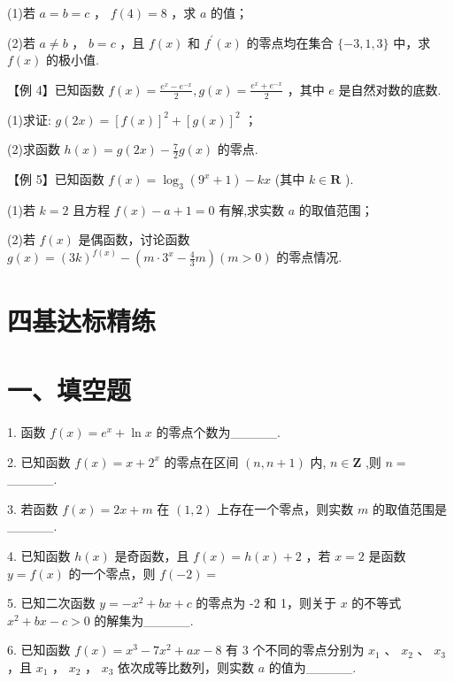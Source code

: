 (1)若 $a = b = c$ ， $f\left( 4\right)  = 8$ ，求 $a$ 的值；

(2)若 $a \neq  b$ ， $b = c$ ，且 $f\left( x\right)$ 和 ${f}^{\prime }\left( x\right)$ 的零点均在集合 $\{  - 3,1,3\}$ 中，求 $f\left( x\right)$ 的极小值.

【例 4】已知函数 $f\left( x\right)  = \frac{{{e}}^{x} - {{e}}^{-x}}{2},g\left( x\right)  = \frac{{{e}}^{x} + {{e}}^{-x}}{2}$ ，其中 ${e}$ 是自然对数的底数.

(1)求证: $g\left( {2x}\right)  = {\left\lbrack  f\left( x\right) \right\rbrack  }^{2} + {\left\lbrack  g\left( x\right) \right\rbrack  }^{2}$ ；

(2)求函数 $h\left( x\right)  = g\left( {2x}\right)  - \frac{7}{2}g\left( x\right)$ 的零点.

【例 5】已知函数 $f\left( x\right)  = {\log }_{3}\left( {{9}^{x} + 1}\right)  - {kx}$ (其中 $k \in  \mathbf{R}$ ).

(1)若 $k = 2$ 且方程 $f\left( x\right)  - a + 1 = 0$ 有解,求实数 $a$ 的取值范围；

(2)若 $f\left( x\right)$ 是偶函数，讨论函数 $g\left( x\right)  = {\left( 3k\right) }^{f\left( x\right) } - \left( {m \cdot  {3}^{x} - \frac{4}{3}m}\right) \left( {m > 0}\right)$ 的零点情况.

\section*{四基达标精练}

\section*{一、填空题}

1. 函数 $f\left( x\right)  = {{e}}^{x} + \ln x$ 的零点个数为\_\_\_\_\_.

2. 已知函数 $f\left( x\right)  = x + {2}^{x}$ 的零点在区间 $\left( {n,n + 1}\right)$ 内, $n \in  \mathbf{Z}$ ,则 $n =$ \_\_\_\_\_.

3. 若函数 $f\left( x\right)  = {2x} + m$ 在 $\left( {1,2}\right)$ 上存在一个零点，则实数 $m$ 的取值范围是\_\_\_\_\_.

4. 已知函数 $h\left( x\right)$ 是奇函数，且 $f\left( x\right)  = h\left( x\right)  + 2$ ，若 $x = 2$ 是函数 $y = f\left( x\right)$ 的一个零点，则 $f\left( {-2}\right)  =$

5. 已知二次函数 $y =  - {x}^{2} + {bx} + c$ 的零点为 -2 和 1，则关于 $x$ 的不等式 ${x}^{2} + {bx} - c > 0$ 的解集为\_\_\_\_\_.

6. 已知函数 $f\left( x\right)  = {x}^{3} - 7{x}^{2} + {ax} - 8$ 有 3 个不同的零点分别为 ${x}_{1}$ 、 ${x}_{2}$ 、 ${x}_{3}$ ，且 ${x}_{1}$ ， ${x}_{2}$ ， ${x}_{3}$ 依次成等比数列，则实数 $a$ 的值为\_\_\_\_\_.

